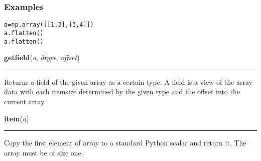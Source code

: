 \begin{boxedminipage}{\textwidth}
\subsubsection*{Examples}
\begin{alltt}
\pysrcprompt{{\textgreater}{\textgreater}{\textgreater} }a = np.array([[1,2], [3,4]])
\pysrcprompt{{\textgreater}{\textgreater}{\textgreater} }a.flatten()
\pysrcoutput{}\pysrcprompt{{\textgreater}{\textgreater}{\textgreater} }a.flatten()
\end{alltt}
    \vspace{1ex}

    \end{boxedminipage}

    \label{numpy:ndarray:getfield}

    \vspace{0.5ex}

    \begin{boxedminipage}{\textwidth}

    \raggedright \textbf{getfield}(\textit{a}, \textit{dtype}, \textit{offset})

    \vspace{-1.5ex}

    \rule{\textwidth}{0.5\fboxrule}

Returns a field of the given array as a certain type. A field is a view of
the array data with each itemsize determined by the given type and the
offset into the current array.
    \vspace{1ex}

    \end{boxedminipage}

    \label{numpy:ndarray:item}

    \vspace{0.5ex}

    \begin{boxedminipage}{\textwidth}

    \raggedright \textbf{item}(\textit{a})

    \vspace{-1.5ex}

    \rule{\textwidth}{0.5\fboxrule}

Copy the first element of array to a standard Python scalar and return
it. The array must be of size one.
    \vspace{1ex}

    \end{boxedminipage}


